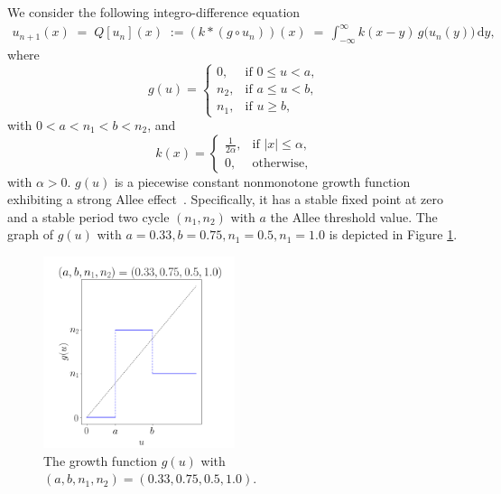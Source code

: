 \documentclass[11pt]{article}
\numberwithin{equation}{section}
\theoremstyle{definition}
\begin{document}
We consider the following integro-difference equation
\begin{align}\label{q}
u_{n+1}(x)\;=\;Q[u_n](x)\;:=(k*(g\circ u_n))(x)\;=\,\int^{\infty}_{-\infty}k(x-y)\,g\big(u_n(y)\big)\,\mathrm{d}y,
\end{align}
where 
\begin{equation} \label{g}
g(u) = \begin{cases}
0, & \text{if } 0 \leq u < a, \\
n_2, & \text{if } a \leq u < b, \\
n_1, & \text{if } u \geq b,
\end{cases}
\end{equation}
with 
$0<a<n_1<b<n_2$,
and
\begin{equation} \label{k}
k(x) = \begin{cases}
\frac{1}{2\alpha}, & \text{if } |x| \leq \alpha, \\
0, & \text{otherwise},
\end{cases}
\end{equation}
with $\alpha >0$. $g(u)$ is a piecewise constant nonmonotone growth function exhibiting a strong Allee effect~\cite{all}. Specifically, it has a stable fixed point at zero and a stable period two cycle $(n_1,n_2)$ with $a$ the Allee threshold value. The graph of $g(u)$ with $a=0.33,b=0.75,n_1=0.5,n_1=1.0$ is depicted in Figure \ref{fig:g}.
\begin{figure}
\begin{center}
\includegraphics[width=0.5\textwidth]{fig1}
\end{center}
\caption{The growth function $g(u)$ with $(a,b,n_1,n_2)=(0.33,0.75,0.5,1.0)$.}
\label{fig:g}
\end{figure}
\end{document}

